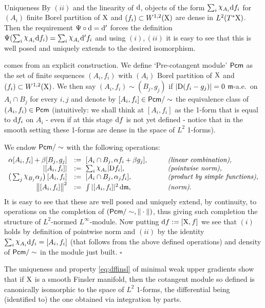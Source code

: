 \documentclass[11pt]{article}
\numberwithin{equation}{section}
\newenvironment{idea}{\removelastskip\par\medskip   %
\noindent{\em Idea of the proof} \rm}{\penalty-20\null\hfill$\square$\par\medbreak}
\newcommand{\X}{{\rm X}}
\newcommand{\mm}{{\mathfrak m}}
\renewcommand{\d}{{\rm d}}
\newcommand{\D}{{\rm D}}
\newcommand{\nchi}{{\raise.3ex\hbox{$\chi$}}}
\begin{document}
\begin{idea}\ \\
{\sc Uniqueness} By $(ii)$  and the linearity of $\d$,  objects of the form $\sum_i\nchi_{A_i}\d f_i$ for $(A_i)$ finite Borel partition of $\X$ and $(f_i)\subset W^{1,2}(\X)$ are dense in $L^2(T^*\X)$. Then the requirement  $\Psi\circ\d=\d'$ forces the definition $\Psi(\sum_i\nchi_{A_i}\d f_i)=\sum_i\nchi_{A_i}\d' f_i$ and using $(i),(ii)$ it is easy to see that this is well posed and uniquely extends to the desired isomorphism.

 comes from an explicit construction. We define `Pre-cotangent module' ${\sf Pcm}$ as the set of finite sequences $(A_i,f_i)$ with $(A_i)$ Borel partition of $\X$ and $(f_i)\subset W^{1,2}(\X)$. We then say $(A_i,f_i)\sim (B_j,g_j)$ if $|\D(f_i-g_j)|=0$ $\mm$-a.e.\ on $A_i\cap B_j$ for every $i,j$ and denote by $[A_i,f_i]\in{\sf Pcm}/\sim$ the equivalence class of $(A_i,f_i)\in {\sf Pcm}$ (intuitively: we shall think at $[A_i,f_i]$ as the 1-form that is equal to $\d f_i$ on $A_i$ - even if at this stage $\d f$ is not yet defined - notice that in the smooth setting these 1-forms are dense in the space of $L^2$ 1-forms). 

We endow ${\sf Pcm}/\sim$ with the following operations:
\[
\begin{array}{rll}
\alpha[A_i,f_i]+\beta[B_j,g_j]&:=\ [A_i\cap B_j,\alpha f_i+\beta g_j],\qquad&\text{\emph {(linear combination),}}\\
|[A_i,f_i]|&:=\ \sum_i\nchi_{A_i}|\D f_i|,\qquad&\text{\emph{(pointwise norm),}}\\
\big(\sum_j\nchi_{B_j}\alpha_j\big)\,[A_i,f_i]&:=\ [A_i\cap B_j,\alpha_j f_i],\qquad&\text{\emph{(product by simple functions),}}\\
\big\|[A_i,f_i]\big\|^2&:=\ {\int |[A_i,f_i]|^2\,\d\mm},\qquad&\text{\emph{(norm)}.}
\end{array}
\]
It is easy to see that these are well posed and uniquely extend, by continuity, to operations on the completion of $({\sf Pcm}/\sim,\|\cdot\|)$, thus giving such completion the structure of $L^2$-normed $L^\infty$-module. Now putting $\d f:=[\X,f]$ we see that $(i)$ holds by definition of pointwise norm and $(ii)$ by the identity $\sum_i\nchi_{A_i}\d f_i=[A_i,f_i]$ (that  follows from the above defined operations) and density of ${\sf Pcm}/\sim$ in the module just built.
\end{idea}
The uniqueness and property \eqref{eq:dffinsl} of minimal weak upper gradients show that if $\X$ is a smooth Finsler manifold, then the cotangent module so defined is canonically isomorphic to the space of $L^2$ 1-forms, the differential being (identified to) the one obtained via integration by parts.
\end{document}
